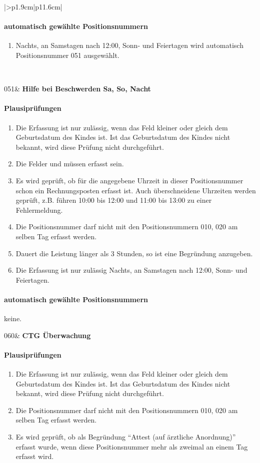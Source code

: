 \begin{mpsupertabular}{|>{\centering}p{1.9cm}|p{11.6cm}|}
\paragraph{automatisch gewählte Positionsnummern}
\begin{enumerate}
\item
Nachts, an Samstagen nach 12:00, Sonn- und Feiertagen wird automatisch 
Positions\-nummer 051 ausgewählt.
\end{enumerate}
\\ \hline


051&
\textbf{Hilfe bei Beschwerden Sa, So, Nacht}
\paragraph{Plausiprüfungen}
\begin{enumerate}
\item
Die Erfassung ist nur zulässig, wenn das Feld  kleiner 
oder gleich dem Geburtsdatum des Kindes ist. Ist das Geburtsdatum des
Kindes nicht bekannt, wird diese Prüfung nicht durchgeführt.
\item
Die Felder  und  müssen erfasst sein.
\item
Es wird geprüft, ob für die angegebene Uhrzeit in dieser Positionsnummer
schon ein Rechnungsposten erfasst ist. Auch überschneidene Uhrzeiten
werden geprüft, z.B. führen 10:00 bis 12:00 und 11:00 bis 13:00 zu einer
Fehlermeldung.
\item
Die Positionsnummer darf nicht mit den Positionsnummern 010, 020 am
selben Tag erfasst werden.
\item
Dauert die Leistung länger als 3 Stunden, so ist eine Begründung anzugeben.
\item
Die Erfassung ist nur zulässig Nachts, an Samstagen nach 12:00, 
Sonn- und Feiertagen.
\end{enumerate}
\paragraph{automatisch gewählte Positionsnummern}
keine.
\\ \hline


060&
\textbf{CTG Überwachung}
\paragraph{Plausiprüfungen}
\begin{enumerate}
\item
Die Erfassung ist nur zulässig, wenn das Feld  kleiner 
oder gleich dem Geburtsdatum des Kindes ist. Ist das Geburtsdatum des
Kindes nicht bekannt, wird diese Prüfung nicht durchgeführt.
\item
Die Positionsnummer darf nicht mit den Positionsnummern 010, 020 am
selben Tag erfasst werden.
\item
Es wird geprüft, ob als Begründung ``Attest (auf ärztliche Anordnung)'' 
erfasst wurde, wenn diese Positionsnummer mehr als zweimal an
einem Tag erfasst wird.
\end{enumerate}

\end{mpsupertabular}
